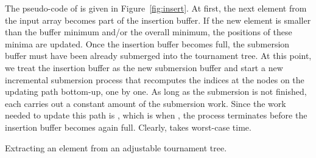 \documentclass[final,onetabnum,onefignum,onethmnum]{siamltex}
\newcommand{\Insert}{\mbox{}}
\begin{document}
The pseudo-code of \Insert{} is given in Figure~\ref{fig:insert}.  At
first, the next element from the input array becomes part of the
insertion buffer. If the new element is smaller than the buffer
minimum and/or the overall minimum, the positions of these minima are
updated.  Once the insertion buffer becomes full, the submersion
buffer must have been already submerged into the tournament tree.  At
this point, we treat the insertion buffer as the new submersion buffer
and start a new incremental submersion process that recomputes the
indices at the nodes on the updating path bottom-up, one by one.  As
long as the submersion is not finished, each \Insert{} carries out a
constant amount of the submersion work. Since the work needed to
update this path is , which is  when , the process
terminates before the insertion buffer becomes again full.  
Clearly, \Insert{} takes  worst-case time.

\begin{algorithm2e}[tb!]
\begin{minipage}{1.1\textwidth}
\SetStartEndCondition{ }{}{}
\DontPrintSemicolon
\Proc{}

\;
\;
\;
\For {} {
  \If {} {
       \;
  }
}
\If {} {
  \;
}

\ElseIf {} {
  \;
  \;
\;
}
\Else {

}
\;
\For {} {
  \If {} {
      \;
  }
}
\end{minipage}

\caption{Extracting an element from an adjustable tournament tree.}
\label{fig:extract}
\end{algorithm2e}
\end{document}
